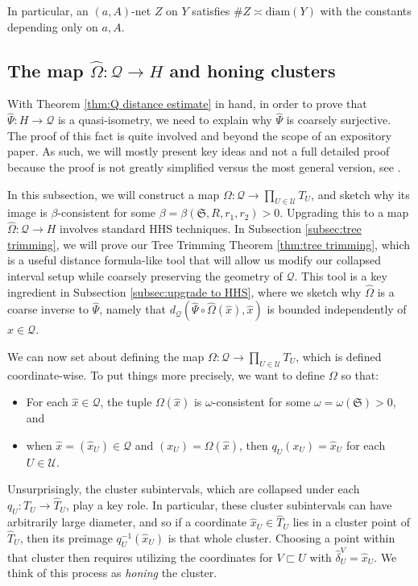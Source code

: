\documentclass{amsart}
\theoremstyle{definition}
\theoremstyle{remark}
\theoremstyle{definition}
\newcommand{\calQ}{\mathcal{Q}}
\newcommand{\calU}{\mathcal{U}}
\newcommand{\hT}{\widehat{T}}
\newcommand{\hx}{\hat{x}}
\newcommand{\hd}{\hat{\delta}}
\newcommand{\hO}{\widehat{\Omega}}
\newcommand{\hPsi}{\widehat{\Psi}}
\newcommand{\diam}{\mathrm{diam}}
\newcommand{\nest}{\sqsubset}
\begin{document}
In particular, an $(a,A)$-net $Z$ on $Y$ satisfies $\#Z \asymp \diam(Y)$ with the constants depending only on $a,A$.








\subsection{The map $\hO:\calQ \to H$ and honing clusters}\label{subsec:hO defined}

With Theorem \ref{thm:Q distance estimate} in hand, in order to prove that $\hPsi:H \to \calQ$ is a quasi-isometry, we need to explain why $\hPsi$ is coarsely surjective.  The proof of this fact is quite involved and beyond the scope of an expository paper.  As such, we will mostly present key ideas and not a full detailed proof because the proof is not greatly simplified versus the most general version, see \cite[Sections 9--11]{Dur_infcube}.

In this subsection, we will construct a map $\Omega:\calQ \to \prod_{U \in \calU} T_U$, and sketch why its image is $\beta$-consistent for some $\beta = \beta(\mathfrak S, R, r_1,r_2)>0$.   Upgrading this to a map $\hO:\calQ \to H$ involves standard HHS techniques.  In Subsection \ref{subsec:tree trimming}, we will prove our Tree Trimming Theorem \ref{thm:tree trimming}, which is a useful distance formula-like tool that will allow us modify our collapsed interval setup while coarsely preserving the geometry of $\calQ$.  This tool is a key ingredient in Subsection \ref{subsec:upgrade to HHS}, where we sketch why $\hO$ is a coarse inverse to $\hPsi$, namely that $d_{\calQ}(\hPsi \circ \hO(\hx), \hx)$ is bounded independently of $\hx \in \calQ$.

We can now set about defining the map $\Omega:\calQ \to \prod_{U \in \calU} T_U$, which is defined coordinate-wise.  To put things more precisely, we want to define $\Omega$ so that:

\begin{itemize}
    \item For each $\hx \in \calQ$, the tuple $\Omega(\hx)$ is $\omega$-consistent for some $\omega = \omega(\mathfrak S)>0$, and
    \item when $\hx  = (\hx_U)\in \calQ$ and $(x_U) = \Omega(\hx)$, then $q_U(x_U) = \hx_U$ for each $U \in \calU$.
\end{itemize}


Unsurprisingly, the cluster subintervals, which are collapsed under each $q_U:T_U \to \hT_U$, play a key role.  In particular, these cluster subintervals can have arbitrarily large diameter, and so if a coordinate $\hx_U\in \hT_U$ lies in a cluster point of $\hT_U$, then its preimage $q_U^{-1}(\hx_U)$ is that whole cluster.  Choosing a point within that cluster then requires utilizing the coordinates for $V \nest U$ with $\hd^V_U = \hx_U$.  We think of this process as \emph{honing} the cluster.
\end{document}
